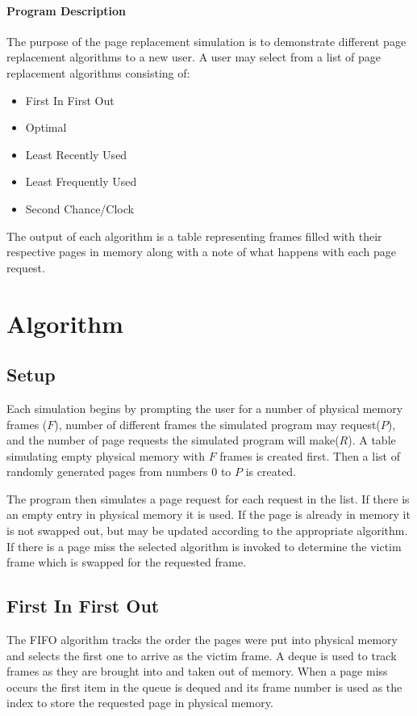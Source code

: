 \documentclass[11pt]{article}
\begin{document}
\maketitle


\begin{multicols}{2}

\paragraph{Program  Description}
The purpose of the page replacement simulation is to demonstrate different page replacement algorithms to a new user. A user may select from a list of page replacement algorithms consisting of:
\begin{itemize}
\item 	First In First Out
\item 	Optimal
\item 	Least Recently Used
\item 	Least Frequently Used
\item 	Second Chance/Clock
\end{itemize}
The output of each algorithm is a table representing frames filled with their respective pages in memory along with a note of what happens with each page request.

\section{Algorithm}\label{algorithm}
\subsection{Setup}
Each simulation begins by prompting the user for a number of physical memory frames ($F$), number of different frames the simulated program may request($P$), and the number of page requests the simulated program will make($R$). A table simulating empty physical memory with $F$ frames is created first. Then a list of randomly generated pages from numbers 0 to $P$ is created.

The program then simulates a page request for each request in the list. If there is an empty entry in physical memory it is used. If the page is already in memory it is not swapped out, but may be updated according to the appropriate algorithm. If there is a page miss the selected algorithm is invoked to determine the victim frame which is swapped for the requested frame.

\subsection{First In First Out}
The FIFO algorithm tracks the order the pages were put into physical memory and selects the first one to arrive as the victim frame. A deque is used to track frames as they are brought into and taken out of memory. When a page miss occurs the first item in the queue is dequed and its frame number is used as the index to store the requested page in physical memory. 


\end{multicols}
\end{document}

